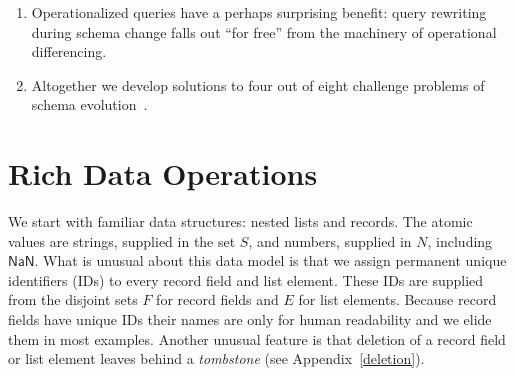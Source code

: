 \documentclass[english,submission]{programming}
\theoremstyle{definition}
\newcommand{\mathbox}[1]{\colorbox{black!10}{$#1$\phantom{i\hspace{-3.5pt}}}}
\begin{document}
\begin{enumerate}
\item Operationalized queries have a perhaps surprising benefit: query rewriting~\cite{curino08, herrmann17} during schema change falls out ``for free'' from the machinery of operational differencing.


\item Altogether we develop solutions to four out of eight challenge problems of schema evolution~\cite{challenge-problems}.

\end{enumerate}







\section{Rich Data Operations}\label{rich-data}

We start with familiar data structures: nested lists and records. The atomic values are strings, supplied in the set \mathbox{S}, and numbers, supplied in \mathbox{N}, including \mathbox{\textsf{NaN}}. What is unusual about this data model is that we assign permanent unique identifiers (IDs) to every record field and list element. These IDs are supplied from the disjoint sets \mathbox{F} for record fields and \mathbox{E} for list elements. Because record fields have unique IDs their names are only for human readability and we elide them in most examples. Another unusual feature is that deletion of a record field or list element leaves behind a \textit{tombstone} (see Appendix~\ref{deletion}).
\end{document}
